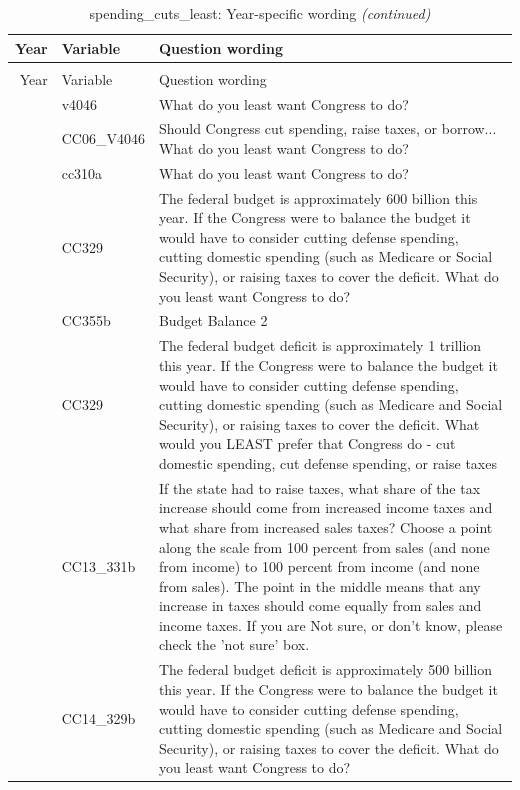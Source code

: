 \documentclass[
  12pt]{article}
\begin{document}
\begin{longtable}[t]{rl>{\raggedright\arraybackslash}p{10cm}}
\caption{\label{tab:unnamed-chunk-5}spending\_cuts\_least: Year-specific wording}\\
\toprule
Year & Variable & Question wording\\
\midrule
\endfirsthead
\caption[]{spending\_cuts\_least: Year-specific wording \textit{(continued)}}\\
\toprule
Year & Variable & Question wording\\
\midrule
\endhead

\endfoot
\bottomrule
\endlastfoot
2006 & v4046 & What do you least want Congress to do?\\
\addlinespace
2007 & CC06\_V4046 & Should Congress cut spending, raise taxes, or borrow... What do you least want Congress to do?\\
\addlinespace
2008 & cc310a & What do you least want Congress to do?\\
\addlinespace
2010 & CC329 & The federal budget is approximately 600 billion this year. If the Congress were to balance the budget it would have to consider cutting defense spending, cutting domestic spending (such as Medicare or Social Security), or raising taxes to cover the deficit. What do you least want Congress to do?\\
\addlinespace
2011 & CC355b & Budget Balance 2\\
\addlinespace
2012 & CC329 & The federal budget deficit is approximately 1 trillion this year. If the Congress were to balance the budget it would have to consider cutting defense spending, cutting domestic spending (such as Medicare and Social Security), or raising taxes to cover the deficit. What would you LEAST prefer that Congress do - cut domestic spending, cut defense spending, or raise taxes\\
\addlinespace
2013 & CC13\_331b & If the state had to raise taxes, what share of the tax increase should come from increased income taxes and what share from increased sales taxes? Choose a point along the scale from 100 percent from sales (and none from income) to 100 percent from income (and none from sales). The point in the middle means that any increase in taxes should come equally from sales and income taxes. If you are Not sure, or don't know, please check the 'not sure' box.\\
\addlinespace
2014 & CC14\_329b & The federal budget deficit is approximately 500 billion this year. If the Congress were to balance the budget it would have to consider cutting defense spending, cutting domestic spending (such as Medicare and Social Security), or raising taxes to cover the deficit. What do you least want Congress to do?\\

\end{longtable}
\end{document}
